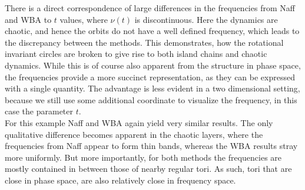 There is a direct correspondence of large differences in the frequencies from Naff and WBA to $t$ values, where $\nu(t)$ is discontinuous. 
Here the dynamics are chaotic, and hence the orbits do not have a well defined frequency, which leads to the discrepancy between the methods. 
This demonstrates, how the rotational invariant circles are broken to give rise to both island chains and chaotic dynamics.
While this is of course also apparent from the structure in phase space, the frequencies provide a more succinct representation, as they can be expressed with a single quantity.
The advantage is less evident in a two dimensional setting, because we still use some additional coordinate to visualize the frequency, in this case the parameter $t$.
\\
For this example Naff and WBA again yield very similar results. 
The only qualitative difference becomes apparent in the chaotic layers, where the frequencies from Naff appear to form thin bands, whereas the WBA results stray more uniformly. 
But more importantly, for both methods the frequencies are mostly contained in between those of nearby regular tori.
As such, tori that are close in phase space, are also relatively close in frequency space.
